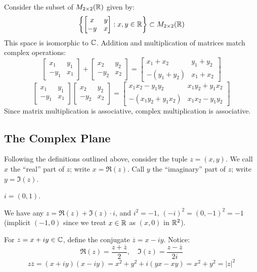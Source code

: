 \documentclass[11pt]{article}
\begin{document}
\begin{remark}
Consider the subset of $M_{2 \times 2}({\mathbb{R}})$ given by:
\[
\left\{ \begin{bmatrix} x & y \\ -y & x \end{bmatrix} : x, y \in {\mathbb{R}} \right\} \subset M_{2 \times 2}({\mathbb{R}})
\]
This space is isomorphic to ${\mathbb{C}}$. Addition and multiplication of matrices match complex operations:
\[
\begin{bmatrix} x_1 & y_1 \\ -y_1 & x_1 \end{bmatrix} + \begin{bmatrix} x_2 & y_2 \\ -y_2 & x_2 \end{bmatrix} = \begin{bmatrix} x_1+x_2 & y_1+y_2 \\ -(y_1+y_2) & x_1+x_2 \end{bmatrix}
\]
\[
\begin{bmatrix} x_1 & y_1 \\ -y_1 & x_1 \end{bmatrix} \begin{bmatrix} x_2 & y_2 \\ -y_2 & x_2 \end{bmatrix} = \begin{bmatrix} x_1 x_2 - y_1 y_2 & x_1 y_2 + y_1 x_2 \\ -(x_1 y_2 + y_1 x_2) & x_1 x_2 - y_1 y_2 \end{bmatrix}
\]
Since matrix multiplication is associative, complex multiplication is associative.
\end{remark}

\subsection{The Complex Plane}
Following the definitions outlined above, consider the tuple $z = (x,y)$. We call $x$ the ``real'' part of $z$; write $x = \Re(z)$. Call $y$ the ``imaginary'' part of $z$; write $y = \Im(z)$.

\begin{definition}[$i$]
$i = (0,1)$.
\end{definition}
We have any $z = \Re(z) + \Im(z)\cdot i$, and $i^2 = -1$, $(-i)^2 = (0,-1)^2 = -1$ (implicit $(-1,0)$ since we treat $x \in {\mathbb{R}}$ as $(x,0)$ in ${\mathbb{R}}^2$).

\begin{definition}[Conjugation]
For $z = x + iy \in {\mathbb{C}}$, define the conjugate $\overline{z} = x - iy$.
Notice:
\[
\Re(z) = \frac{z + \overline{z}}{2}, \quad \Im(z) = \frac{z - \overline{z}}{2i}
\]
\[
z\overline{z} = (x + iy)(x - iy) = x^2 + y^2 + i(yx - xy) = x^2 + y^2 = |z|^2
\]
\end{definition}
\end{document}
